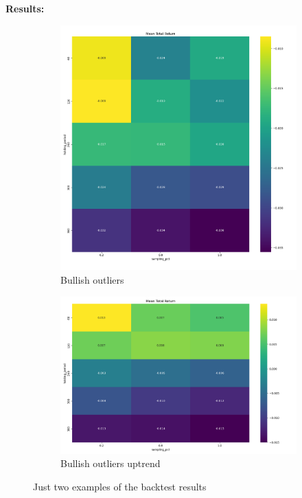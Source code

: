 \documentclass[12pt]{article}
\begin{document}
\textbf{Results:}

\begin{figure}[H]
    \centering
    \begin{subfigure}[b]{0.48\textwidth}
        \includegraphics[width=\textwidth,height=0.3\textheight,keepaspectratio]{imgs/example_backtest_for_thesis.png}
        \caption{Bullish outliers}
        \label{fig:bullish_outliers}
    \end{subfigure}
    \hfill
    \begin{subfigure}[b]{0.48\textwidth}
        \includegraphics[width=\textwidth,height=0.3\textheight,keepaspectratio]{imgs/example_for_thesis_v2.png}
        \caption{Bullish outliers uptrend}
        \label{fig:bullish_outliers_uptrend}
    \end{subfigure}
    \caption{Just two examples of the backtest results}
    \label{fig:bullish_outliers_comparison}
\end{figure}
\end{document}
